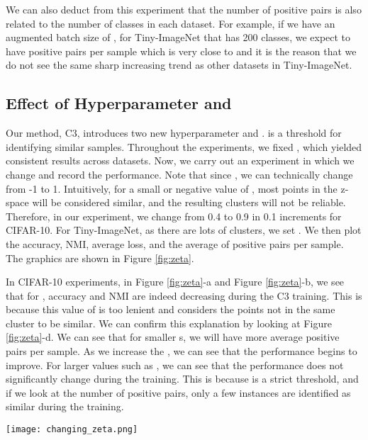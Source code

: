 \documentclass{bmvc2k}
\begin{document}
We can also deduct from this experiment that the number of positive pairs is also related to the number of classes in each dataset. For example, if we have an augmented batch size of , for Tiny-ImageNet that has 200 classes, we expect to have  positive pairs per sample which is very close to  and it is the reason that we do not see the same sharp increasing trend as other datasets in Tiny-ImageNet.
\vspace{-5mm}
\subsection{Effect of Hyperparameter  and }
\vspace{-2mm}

Our method, C3, introduces two new hyperparameter  and .  is a threshold for identifying similar samples. Throughout the experiments, we fixed , which yielded consistent results across datasets. Now, we carry out an experiment in which we change  and record the performance. Note that since , we can technically change  from -1 to 1. Intuitively, for a small or negative value of , most points in the z-space will be considered similar, and the resulting clusters will not be reliable. Therefore, in our experiment, we change  from 0.4 to 0.9 in 0.1 increments for CIFAR-10. For Tiny-ImageNet, as there are lots of clusters, we set . We then plot the accuracy, NMI, average loss, and the average of positive pairs per sample. The graphics are shown in Figure \ref{fig:zeta}.

In CIFAR-10 experiments, in Figure \ref{fig:zeta}-a and Figure \ref{fig:zeta}-b, we see that for , accuracy and NMI are indeed decreasing during the C3 training. This is because this value of  is too lenient and considers the points not in the same cluster to be similar. We can confirm this explanation by looking at Figure \ref{fig:zeta}-d. We can see that for smaller s, we will have more average positive pairs per sample. As we increase the , we can see that the performance begins to improve. For larger values such as , we can see that the performance does not significantly change during the training. This is because  is a strict threshold, and if we look at the number of positive pairs, only a few instances are identified as similar during the training.
 
 \begin{figure*}[t!]
  \centering
  \texttt{[image: changing\_zeta.png]}
  \vspace{-2mm}
  \caption{Performance and behavior of C3 for different values of , for CIFAR 10 (top row) and Tiny-ImageNet (bottom row).} \vspace{-6mm}
  \label{fig:zeta}
\end{figure*}
\end{document}
